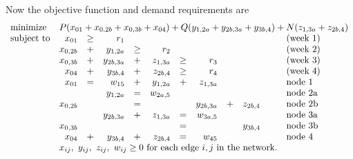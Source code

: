\begin{enumerate}
\begin{solution}
\begin{center}
\end{center}

Now the objective function and demand requirements are
\[
\begin{array}{lrrrrrrrrll}
\textrm{minimize} & \multicolumn{10}{r}{P(x_{01} + x_{0,2b} + x_{0,3b} + x_{04}) + Q(y_{1,2a}+y_{2b,3a}+y_{3b,4}) +N(z_{1,3a}+z_{2b,4})} \\
\textrm{subject to} & x_{01} & \geq & r_1 &&&&&&&\text{(week 1)}\\
& x_{0,2b}&+&y_{1,2a}&\geq&r_2&&&&&\text{(week 2)}\\
& x_{0,3b}&+&y_{2b,3a}&+&z_{1,3a}&\geq&r_3&&&\text{(week 3)}\\
& x_{04}&+&y_{3b,4}&+&z_{2b,4}&\geq&r_4&&&\text{(week 4)}\\
& x_{01}&=&w_{15}&+&y_{1,2a}&+&z_{1,3a}&&&\text{node 1}\\
& &&y_{1,2a}&=&w_{2a,5}&&&&&\text{node 2a} \\
& x_{0,2b}&&&=&&&y_{2b,3a}&+&z_{2b,4}&\text{node 2b} \\
& &&y_{2b,3a}&+&z_{1,3a}&=&w_{3a,5}&&&\text{node 3a} \\
& x_{0,3b}&&&&&=&&&y_{3b,4}&\text{node 3b} \\
& x_{04}&+&y_{3b,4}&+&z_{2b,4}&=&w_{45}&&&\text{node 4}\\
& \multicolumn{9}{r}{x_{ij},~y_{ij},~z_{ij},~w_{ij} \geq 0~\text{for each edge $i,j$ in the network.}}
\end{array}
\]

\end{solution}


\end{enumerate}
